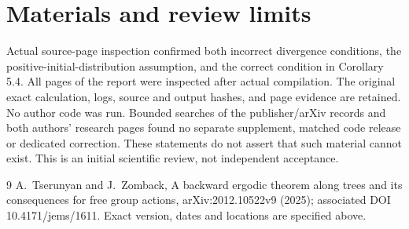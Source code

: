 \documentclass[10pt]{article}
\begin{document}
\section*{Materials and review limits}
Actual source-page inspection confirmed both incorrect divergence conditions, the positive-initial-distribution assumption, and the correct condition in Corollary 5.4. All pages of the report were inspected after actual compilation. The original exact calculation, logs, source and output hashes, and page evidence are retained. No author code was run. Bounded searches of the publisher/arXiv records and both authors’ research pages found no separate supplement, matched code release or dedicated correction. These statements do not assert that such material cannot exist. This is an initial scientific review, not independent acceptance.\par
9 A. Tserunyan and J. Zomback, A backward ergodic theorem along trees and its consequences for free group actions, arXiv:2012.10522v9 (2025); associated DOI 10.4171/jems/1611. Exact version, dates and locations are specified above.\par
\end{document}

